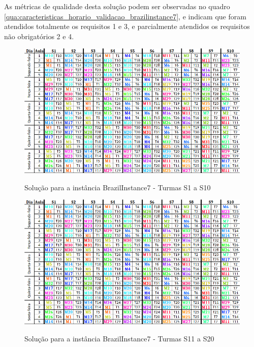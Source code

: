 As métricas de qualidade desta solução podem ser observadas no quadro \ref{qua:caracteristicas_horario_validacao_brazilinstance7}, e indicam que foram atendidos totalmente os requisitos 1 e 3, e parcialmente atendidos os requisitos não obrigatórios 2 e 4.

\begin{figure}[h]
	\centering
	\caption{Solução para a instância BrazilInstance7 - Turmas S1 a S10}
	\includegraphics[width=1\textwidth]{./dados/figuras/brazilinstance7}
	\label{fig:brazilinstance7_solucao}
\end{figure}

\begin{figure}[h]
	\centering
	\caption{Solução para a instância BrazilInstance7 - Turmas S11 a S20}
	\includegraphics[width=1\textwidth]{./dados/figuras/brazilinstance7}
	\label{fig:brazilinstance7_solucao_2}
\end{figure}

